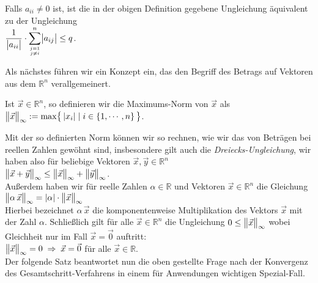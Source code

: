 \noindent
Falls $a_{ii} \not=0$ ist, ist die in der obigen Definition gegebene Ungleichung 
\"aquivalent zu  der Ungleichung
\\[0.2cm]
\hspace*{1.3cm}
$\displaystyle\frac{1}{\bigl|a_{ii}\bigr|}\cdot\sum\limits_{j=1 \atop j \not= i}^n \bigl| a_{ij} \bigr| \leq q$. 


\noindent
Als n\"achstes f\"uhren wir ein Konzept ein, das den Begriff des Betrags auf Vektoren aus
dem $\mathbb{R}^n$ verallgemeinert.
\begin{Definition}
  Ist $\vec{x} \in \mathbb{R}^{n}$, so definieren wir die Maximums-Norm von
  $\vec{x}$ als 
  \\[0.2cm]
  \hspace*{1.3cm} $\big\|\vec{x}\bigr\|_{\infty} := \max\bigl\{\, |x_i| \mid i \in \{1,\cdots,n\}\, \bigr\}$.
\end{Definition}
Mit der so definierten Norm k\"onnen wir so rechnen, wie wir das von Betr\"agen bei reellen
Zahlen gew\"ohnt sind,  insbesondere gilt auch die \emph{Dreiecks-Ungleichung}, wir haben also
f\"ur beliebige Vektoren $\vec{x}, \vec{y} \in \mathbb{R}^{n}$ 
\\[0.3cm]
\hspace*{1.3cm}
$\big\|\vec{x} + \vec{y}\bigr\|_{\infty} \leq \big\|\vec{x}\bigr\|_{\infty} + \big\|\vec{y}\bigr\|_{\infty}$.
\\[0.3cm]
Au{\ss}erdem haben wir f\"ur reelle Zahlen $\alpha \in\mathbb{R}$ und Vektoren
$\vec{x}\in\mathbb{R}^n$ die Gleichung 
\\[0.2cm]
\hspace*{1.3cm}
$\big\| \alpha\,\vec{x} \bigr\|_{\infty} = |\alpha|\cdot  \big\|\vec{x}\bigr\|_{\infty}$
\\[0.2cm]
Hierbei bezeichnet $\alpha\,\vec{x}$ die komponentenweise Multiplikation des Vektors
$\vec{x}$ mit der Zahl $\alpha$.
Schlie{\ss}lich gilt f\"ur alle $\vec{x}\in\mathbb{R}^n$ die Ungleichung 
$0 \leq \big\|\vec{x}\bigr\|_{\infty}$ wobei Gleichheit nur im Fall $\vec{x} = \vec{0}$ auftritt:
\\[0.2cm]
\hspace*{1.3cm}
$\big\|\vec{x}\bigr\|_{\infty} = 0 \;\Rightarrow\; \vec{x} = \vec{0}$ \quad f\"ur alle $\vec{x}\in\mathbb{R}$.
\\[0.2cm] 
Der folgende Satz beantwortet nun die oben gestellte Frage nach der Konvergenz des
Gesamtschritt-Verfahrens in einem f\"ur Anwendungen wichtigen Spezial-Fall.

